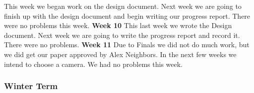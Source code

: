 \documentclass[onecolumn, draftclsnofoot,10pt, compsoc]{IEEEtran}
\begin{document}
This week we began work on the design document.
\newline
Next week we are going to finish up with the design document and begin writing our progress report.
\newline
There were no problems this week.
\newline
\textbf{Week 10}
\newline
This last week we wrote the Design document.
\newline
Next week we are going to write the progress report and record it.
\newline
There were no problems.
\newline
\textbf{Week 11}
\newline
Due to Finals we did not do much work, but we did get our paper approved by Alex Neighbors.
\newline
In the next few weeks we intend to choose a camera.
\newline
We had no problems this week.

\subsubsection{Winter Term}
\end{document}
